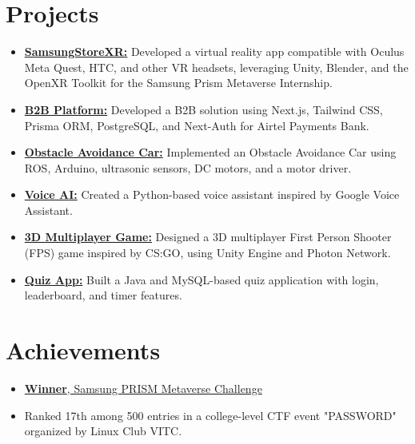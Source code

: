 \documentclass[a4paper,10pt]{article}
\newcommand{\sectionbreak}{\vspace{0.2em}} %
\begin{document}
\section{Projects}
\begin{itemize}[noitemsep, topsep=0pt]
    \item \href{https://github.com/Shival-Gupta/SamsungStoreXR}{\textcolor{accentcolor}{\textbf{SamsungStoreXR:}}} Developed a virtual reality app compatible with Oculus Meta Quest, HTC, and other VR headsets, leveraging Unity, Blender, and the OpenXR Toolkit for the Samsung Prism Metaverse Internship.
    \item \href{https://b2b-portal-rho.vercel.app/}{\textcolor{accentcolor}{\textbf{B2B Platform:}}} Developed a B2B solution using Next.js, Tailwind CSS, Prisma ORM, PostgreSQL, and Next-Auth for Airtel Payments Bank.
    \item \href{https://github.com/Shival-Gupta/obstacle-avoidance-car-ros-noetic}{\textcolor{accentcolor}{\textbf{Obstacle Avoidance Car:}}} Implemented an Obstacle Avoidance Car using ROS, Arduino, ultrasonic sensors, DC motors, and a motor driver.
    \item \href{https://github.com/Shival-Gupta/VoiceAI}{\textcolor{accentcolor}{\textbf{Voice AI:}}} Created a Python-based voice assistant inspired by Google Voice Assistant.
    \item \href{https://github.com/Shival-Gupta/WarGame}{\textcolor{accentcolor}{\textbf{3D Multiplayer Game:}}} Designed a 3D multiplayer First Person Shooter (FPS) game inspired by CS:GO, using Unity Engine and Photon Network.
    \item \href{https://github.com/Shival-Gupta/QuizApp}{\textcolor{accentcolor}{\textbf{Quiz App:}}} Built a Java and MySQL-based quiz application with login, leaderboard, and timer features.
\end{itemize}


\sectionbreak

\section{Achievements}
\begin{itemize}[noitemsep, topsep=0pt]
    \item \href{https://drive.google.com/file/d/19xeCrN3ycqXisyDDgIYeygRRVawMKOxu/view?usp=sharing}{\textcolor{accentcolor}{\textbf{Winner}, Samsung PRISM Metaverse Challenge}}
    \item Ranked 17th among 500 entries in a college-level CTF event "PASSWORD" organized by Linux Club VITC.
\end{itemize}
\end{document}
